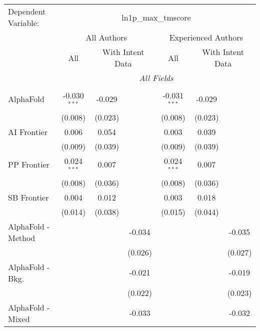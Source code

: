 \begingroup
\centering
\begin{tabular}{lcccccc}
   \tabularnewline \midrule \midrule
   Dependent Variable: & \multicolumn{6}{c}{ln1p\_max\_tmscore}\\
 & \multicolumn{3}{c}{All Authors} & \multicolumn{3}{c}{Experienced Authors} \\
\cmidrule(lr){2-4} \cmidrule(lr){5-7}
 & \multicolumn{1}{c}{All} & \multicolumn{2}{c}{With Intent Data} & \multicolumn{1}{c}{All} & \multicolumn{2}{c}{With Intent Data} \\
\cmidrule(lr){2-2} \cmidrule(lr){3-4} \cmidrule(lr){5-5} \cmidrule(lr){6-7}
 & \multicolumn{6}{c}{\textit{All Fields}} \\ \\
   AlphaFold            & -0.030$^{***}$ & -0.029  &           & -0.031$^{***}$ & -0.029  &   \\   
                        & (0.008)        & (0.023) &           & (0.008)        & (0.023) &   \\   
   AI Frontier          & 0.006          & 0.054   &           & 0.003          & 0.039   &   \\   
                        & (0.009)        & (0.039) &           & (0.009)        & (0.039) &   \\   
   PP Frontier          & 0.024$^{***}$  & 0.007   &           & 0.024$^{***}$  & 0.007   &   \\   
                        & (0.008)        & (0.036) &           & (0.008)        & (0.036) &   \\   
   SB Frontier          & 0.004          & 0.012   &           & 0.003          & 0.018   &   \\   
                        & (0.014)        & (0.038) &           & (0.015)        & (0.044) &   \\   
   AlphaFold - Method   &                &         & -0.034    &                &         & -0.035\\   
                        &                &         & (0.026)   &                &         & (0.027)\\   
   AlphaFold - Bkg.     &                &         & -0.021    &                &         & -0.019\\   
                        &                &         & (0.022)   &                &         & (0.023)\\   
   AlphaFold - Mixed    &                &         & -0.033    &                &         & -0.032\\   

\end{tabular}
